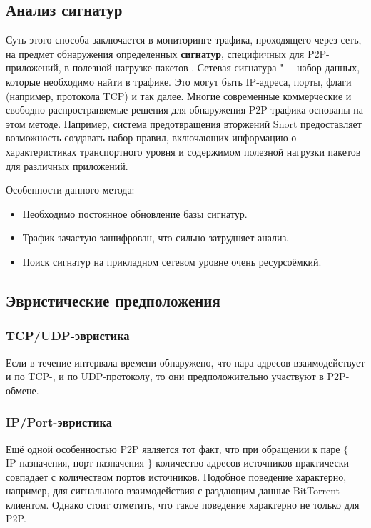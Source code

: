 \documentclass[bachelor, och, coursework]{SCWorks}
\begin{document}
\subsection{Анализ сигнатур}
Суть этого способа заключается в мониторинге трафика, проходящего через сеть, 
на предмет обнаружения определенных \textbf{сигнатур}, специфичных для P2P-приложений, в полезной нагрузке пакетов \cite{seclab}. Сетевая сигнатура "--- набор данных, которые необходимо найти в трафике. Это могут быть IP-адреса, порты, флаги (например, протокола TCP) и так далее. Многие современные коммерческие и свободно распространяемые решения для обнаружения P2P трафика основаны на этом методе. Например, система предотвращения вторжений Snort предоставляет возможность создавать набор правил, включающих информацию о характеристиках транспортного уровня и содержимом полезной нагрузки пакетов для различных приложений. 

Особенности данного метода:
\begin{itemize}
    \item Необходимо постоянное обновление базы сигнатур.
    \item Трафик зачастую зашифрован, что сильно затрудняет анализ.
    \item Поиск сигнатур на прикладном сетевом уровне очень ресурсоёмкий.
\end{itemize}

\subsection{Эвристические предположения}

\subsubsection{TCP/UDP-эвристика}
Если в течение интервала времени обнаружено, что пара адресов взаимодействует и по TCP-, и по UDP-протоколу, то они
предположительно участвуют в P2P-обмене.

\subsubsection{IP/Port-эвристика}
Ещё одной особенностью P2P является тот факт, что при обращении к паре $\{$ IP-назначения, порт-назначения $\}$
количество адресов источников практически совпадает с количеством портов источников. Подобное поведение
характерно, например, для сигнального взаимодействия с раздающим данные BitTorrent-клиентом. Однако стоит отметить,
что такое поведение характерно не только для P2P.
\end{document}
